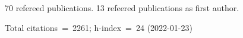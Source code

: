 70 refereed publications. 13 refeered publications as first author.

Total citations~=~2261; h-index~=~24 (2022-01-23)